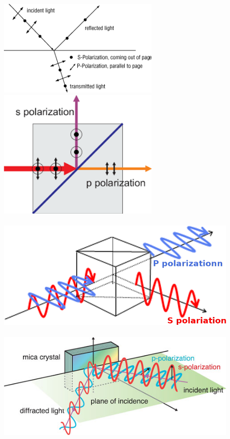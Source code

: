 \documentclass{article}
\begin{document}

\hspace{-3cm}\includegraphics[width=8cm]{1.png}
\hspace{1cm}\includegraphics[width=8cm]{2.png}\\
\vspace{0.5cm}\\
\includegraphics[width=12cm]{3.png}\\
\vspace{0.5cm}\\
\includegraphics[width=12cm]{4.png}
\end{document}
